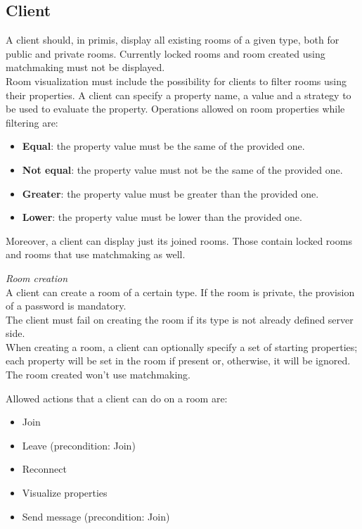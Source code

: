 \subsection{Client} \label{client}

A client should, in primis, display all existing rooms of a given type, both for public and private rooms. Currently locked rooms and room created using matchmaking must not be displayed.
\\
Room visualization must include the possibility for clients to filter rooms using their properties. A client can specify a property name, a value and a strategy to be used to evaluate the property. Operations allowed on room properties while filtering are:
\begin{itemize}
\item \textbf{Equal}: the property value must be the same of the provided one.
\item \textbf{Not equal}: the property value must not be the same of the provided one.
\item \textbf{Greater}: the property value must be greater than the provided one.
\item \textbf{Lower}: the property value must be lower than the provided one.
\end{itemize}

Moreover, a client can display just its joined rooms. Those contain locked rooms and rooms that use matchmaking as well. 

\bigskip
\textit{Room creation}
\\
A client can create a room of a certain type. If the room is private, the provision of a password is mandatory.
\\
The client must fail on creating the room if its type is not already defined server side.
\\
When creating a room, a client can optionally specify a set of starting properties; each property will be set in the room if present or, otherwise, it will be ignored.
\\
The room created won't use matchmaking.

\bigskip
Allowed actions that a client can do on a room are:
\begin{itemize}
\item Join
\item Leave (precondition: Join)
\item Reconnect
\item Visualize properties
\item Send message (precondition: Join)
\end{itemize}

